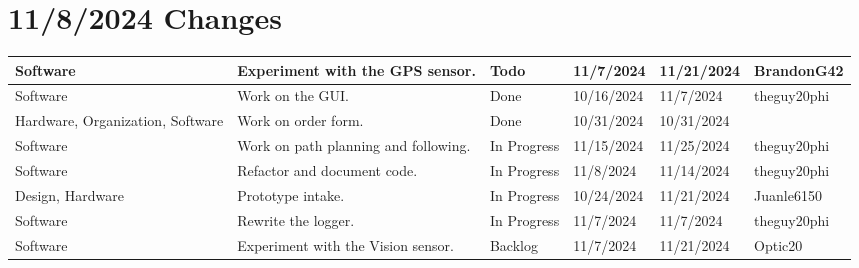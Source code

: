 \section{11/8/2024 Changes}
\begin{center}
\begin{longtable}{| p{40pt} | p{150pt} | p{35pt} | p{33pt} | p{33pt} | p{40pt} |}
\hline \rowcolor{IndianRed1}
Software & Experiment with the GPS sensor. & Todo & 11/7/2024 & 11/21/2024 & BrandonG42 \\
\hline \rowcolor{DarkSeaGreen1}
Software & Work on the GUI. & Done & 10/16/2024 & 11/7/2024 & theguy20phi \\
\hline \rowcolor{DarkSeaGreen1}
Hardware, Organization, Software & Work on order form. & Done & 10/31/2024 & 10/31/2024 & \\
\hline \rowcolor{LightGoldenrod1}
Software & Work on path planning and following. & In Progress & 11/15/2024 & 11/25/2024 & theguy20phi \\
\hline \rowcolor{LightGoldenrod1}
Software & Refactor and document code. & In Progress & 11/8/2024 & 11/14/2024 & theguy20phi \\
\hline \rowcolor{LightGoldenrod1}
Design, Hardware & Prototype intake. & In Progress & 10/24/2024 & 11/21/2024 & Juanle6150 \\
\hline \rowcolor{LightGoldenrod1}
Software & Rewrite the logger. & In Progress & 11/7/2024 & 11/7/2024 & theguy20phi \\
\hline \rowcolor{Ivory2}
Software & Experiment with the Vision sensor. & Backlog & 11/7/2024 & 11/21/2024 & Optic20 \\
\hline
\end{longtable}
\end{center}


